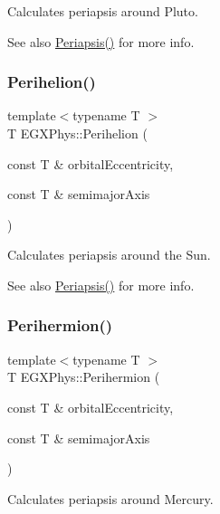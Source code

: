 Calculates periapsis around Pluto. 

\begin{DoxySeeAlso}{See also}
\hyperlink{group___periapsis_ga4414ac75539371ec874a3d25cad6c9fe}{Periapsis()} for more info. 
\end{DoxySeeAlso}
\mbox{\label{group___periapsis_ga941d285e3a0b48ada9c9f60925ff63c2}} 
\subsubsection{\texorpdfstring{Perihelion()}{Perihelion()}}
{\footnotesize\ttfamily template$<$typename T $>$ \\
T E\+G\+X\+Phys\+::\+Perihelion (\begin{DoxyParamCaption}\item[{const T \&}]{orbital\+Eccentricity,  }\item[{const T \&}]{semimajor\+Axis }\end{DoxyParamCaption})}



Calculates periapsis around the Sun. 

\begin{DoxySeeAlso}{See also}
\hyperlink{group___periapsis_ga4414ac75539371ec874a3d25cad6c9fe}{Periapsis()} for more info. 
\end{DoxySeeAlso}
\mbox{\label{group___periapsis_ga9562e9cbfd73019ae9cdaa643b843d63}} 
\subsubsection{\texorpdfstring{Perihermion()}{Perihermion()}}
{\footnotesize\ttfamily template$<$typename T $>$ \\
T E\+G\+X\+Phys\+::\+Perihermion (\begin{DoxyParamCaption}\item[{const T \&}]{orbital\+Eccentricity,  }\item[{const T \&}]{semimajor\+Axis }\end{DoxyParamCaption})}



Calculates periapsis around Mercury. 

